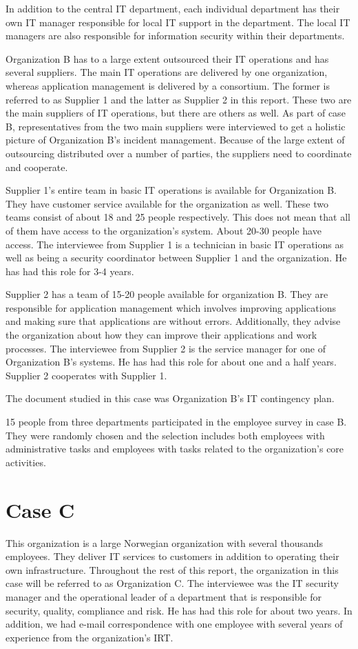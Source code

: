 In addition to the central IT department, %
each individual department has their own IT manager responsible for local IT support in the department. The local IT managers are also responsible for information security within their departments.

Organization B has to a large extent outsourced their IT operations and has several suppliers. The main IT operations are delivered by one organization, whereas application management is delivered by a consortium. The former is referred to as Supplier 1 and the latter as Supplier 2 in this report. These two are the main suppliers of IT operations, but there are others as well. As part of case B, representatives from the two main suppliers were interviewed to get a holistic picture of Organization B's incident management. Because of the large extent of outsourcing distributed over a number of parties, the suppliers need to coordinate and cooperate. 

Supplier 1's entire team in basic IT operations is available for Organization B. They have customer service available for the organization as well. These two teams consist of about 18 and 25 people respectively. This does not mean that all of them have access to the organization's system. About 20-30 people have access. The interviewee from Supplier 1 is a technician in basic IT operations as well as being a security coordinator between Supplier 1 and the organization. He has had this role for 3-4 years.

Supplier 2 has a team of 15-20 people available for organization B. They are responsible for application management which involves improving applications and making sure that applications are without errors. Additionally, they advise the organization about how they can improve their applications and work processes. The interviewee from Supplier 2 is the service manager for one of Organization B's systems. He has had this role for about one and a half years. Supplier 2 cooperates with Supplier 1.

The document studied in this case was Organization B's IT contingency plan.

15 people from three departments participated in the employee survey in case B. They were randomly chosen and the selection includes both employees with administrative tasks and employees with tasks related to the organization's core activities.

\section{Case C}
This organization is a large Norwegian organization with several thousands employees. They deliver IT services to customers in addition to operating their own infrastructure. Throughout the rest of this report, the organization in this case will be referred to as Organization C. The interviewee was the IT security manager and the operational leader of a department that is responsible for security, quality, compliance and risk. He has had this role for about two years. In addition, we had e-mail correspondence with one employee with several years of experience from the organization's IRT.

